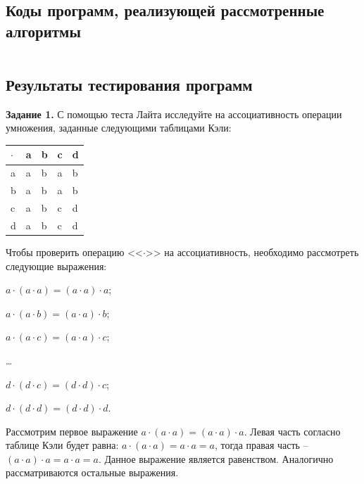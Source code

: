 \documentclass[bachelor, och, labwork]{shiza}
\begin{document}
        \subsection{Коды программ, реализующей рассмотренные алгоритмы}


        \inputminted[fontsize=\small]{Python}{code/aua-lab3.py}








    \subsection{Результаты тестирования программ}
        \textbf{Задание 1.} С помощью теста Лайта исследуйте на ассоциативность операции умножения, заданные следующими таблицами Кэли:

        \begin{table}[H]
            \centering
            \begin{tabular}{|l|l|l|l|l|}
            \hline
            $\cdot$ & a & b & c & d \\ \hline
            a & a & b & a & b \\ \hline
            b & a & b & a & b \\ \hline
            c & a & b & c & d \\ \hline
            d & a & b & c & d \\ \hline
        \end{tabular}
        \end{table}

        
        Чтобы проверить операцию <<$\cdot$>> на ассоциативность, необходимо рассмотреть следующие выражения:
        \begin{center}
            $a \cdot (a \cdot a) = (a \cdot a) \cdot a$;

            $a \cdot (a \cdot b) = (a \cdot a) \cdot b$;

            $a \cdot (a \cdot c) = (a \cdot a) \cdot c$;

            \dots

            $d \cdot (d \cdot c) = (d \cdot d) \cdot c$;

            $d \cdot (d \cdot d) = (d \cdot d) \cdot d$.
        \end{center}
        
        Рассмотрим первое выражение $a \cdot (a \cdot a) = (a \cdot a) \cdot a$. Левая часть согласно таблице Кэли будет равна:
        $a \cdot (a \cdot a) = a \cdot a = a$, тогда правая часть -- $(a \cdot a) \cdot a = a \cdot a = a$. Данное выражение является равенством.
        Аналогично рассматриваются остальные выражения.
\end{document}
